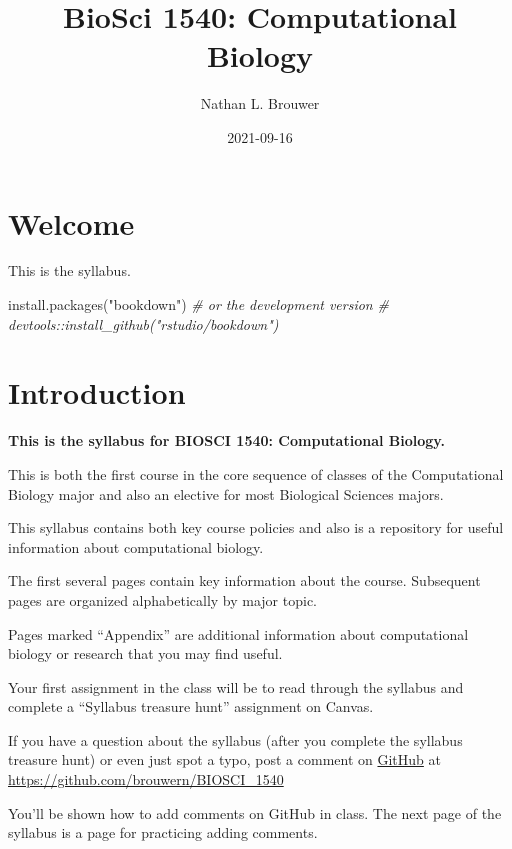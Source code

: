 \documentclass[
]{book}
\title{BioSci 1540: Computational Biology}
\author{Nathan L. Brouwer}
\date{2021-09-16}
\newenvironment{Shaded}{\begin{snugshade}}{\end{snugshade}}
\newcommand{\CommentTok}[1]{\textcolor[rgb]{0.56,0.35,0.01}{\textit{#1}}}
\newcommand{\FunctionTok}[1]{\textcolor[rgb]{0.00,0.00,0.00}{#1}}
\newcommand{\NormalTok}[1]{#1}
\newcommand{\StringTok}[1]{\textcolor[rgb]{0.31,0.60,0.02}{#1}}
\begin{document}
\maketitle

{
\setcounter{tocdepth}{1}
\tableofcontents
}
\hypertarget{welcome}{%
\chapter{Welcome}\label{welcome}}

This is the syllabus.

\begin{Shaded}
\begin{Highlighting}[]
\FunctionTok{install.packages}\NormalTok{(}\StringTok{"bookdown"}\NormalTok{)}
\CommentTok{\# or the development version}
\CommentTok{\# devtools::install\_github("rstudio/bookdown")}
\end{Highlighting}
\end{Shaded}

\hypertarget{intro}{%
\chapter{Introduction}\label{intro}}

\textbf{This is the syllabus for BIOSCI 1540: Computational Biology.}

This is both the first course in the core sequence of classes of the Computational Biology major and also an elective for most Biological Sciences majors.

This syllabus contains both key course policies and also is a repository for useful information about computational biology.

The first several pages contain key information about the course. Subsequent pages are organized alphabetically by major topic.

Pages marked ``Appendix'' are additional information about computational biology or research that you may find useful.

Your first assignment in the class will be to read through the syllabus and complete a ``Syllabus treasure hunt'' assignment on Canvas.

If you have a question about the syllabus (after you complete the syllabus treasure hunt) or even just spot a typo, post a comment on \href{https://github.com/brouwern/BIOSCI_1540}{GitHub} at \url{https://github.com/brouwern/BIOSCI_1540}

You'll be shown how to add comments on GitHub in class. The next page of the syllabus is a page for practicing adding comments.
\end{document}
